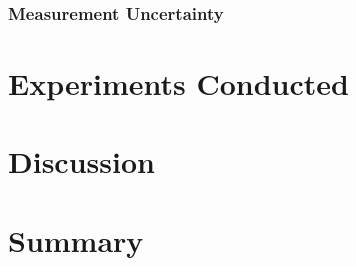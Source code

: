 \documentclass[12pt,oneside]{book}
\begin{document}
\subsection{Measurement Uncertainty}
\label{subsec:measure_locs}


\chapter{Experiments Conducted}




\chapter{Discussion}


\chapter{Summary}




\clearpage

\appendix
\end{document}
